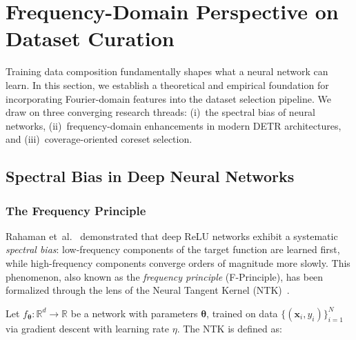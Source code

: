 
\section{Frequency-Domain Perspective on Dataset Curation}
\label{sec:fourier_research}

Training data composition fundamentally shapes what a neural network can
learn.  In this section, we establish a theoretical and empirical foundation
for incorporating Fourier-domain features into the dataset selection pipeline.
We draw on three converging research threads: (i)~the spectral bias of neural
networks, (ii)~frequency-domain enhancements in modern DETR architectures,
and (iii)~coverage-oriented coreset selection.


\subsection{Spectral Bias in Deep Neural Networks}
\label{sec:spectral_bias_theory}

\subsubsection{The Frequency Principle}

Rahaman et~al.~\cite{rahaman2019spectral} demonstrated that deep ReLU
networks exhibit a systematic \emph{spectral bias}: low-frequency components
of the target function are learned first, while high-frequency components
converge orders of magnitude more slowly.  This phenomenon, also known as
the \emph{frequency principle} (F-Principle), has been formalized through
the lens of the Neural Tangent Kernel (NTK)~\cite{jacot2018ntk}.

Let $f_{\boldsymbol{\theta}}: \mathbb{R}^d \to \mathbb{R}$ be a network with
parameters $\boldsymbol{\theta}$, trained on data
$\{(\mathbf{x}_i, y_i)\}_{i=1}^N$ via gradient descent with learning rate
$\eta$.  The NTK is defined as:

